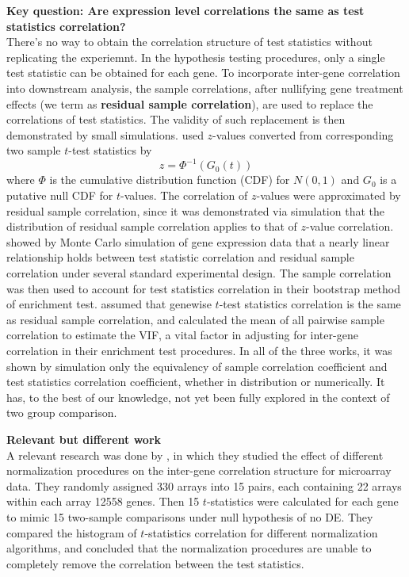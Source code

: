 \documentclass[11pt, a4paper]{article}
\begin{document}
\textbf{Key question: Are  expression level  correlations the same as test statistics correlation?}\\
There's no way to obtain the correlation structure of test statistics without replicating the experiemnt.  
In the hypothesis testing procedures, only a single test statistic can be obtained for each gene. To incorporate inter-gene correlation into downstream analysis,  the sample correlations, after nullifying gene treatment effects (we term as \textbf{residual sample correlation}), are used to replace the correlations of test statistics. The validity of such replacement is then demonstrated by small simulations. \cite{efron2007correlation} used $z$-values converted from corresponding two sample $t$-test statistics by 
\begin{equation}\label{t2z}
z  = \Phi^{-1}(G_0(t))
\end{equation}
where $\Phi$ is the cumulative distribution function (CDF) for $N(0, 1)$ and $G_0$ is a putative null CDF for $t$-values. The correlation of $z$-values were approximated by residual sample correlation, since it was demonstrated via simulation that the distribution of residual sample correlation applies to that of $z$-value correlation. \cite{barry2008statistical} showed by Monte Carlo simulation of gene expression data that a nearly linear relationship holds between test statistic correlation and residual sample correlation under several standard experimental design. The sample correlation was then used to account for test statistics correlation in their bootstrap method of enrichment test. \cite{wu2012camera} assumed that genewise $t$-test statistics correlation is the same as residual sample correlation, and calculated the mean of all pairwise sample correlation to estimate the VIF, a vital factor in adjusting for inter-gene correlation in their enrichment test procedures. In all of the three works, it was shown by simulation only the equivalency of sample correlation coefficient and test statistics correlation coefficient, whether in distribution or numerically. It has, to the best of our knowledge, not yet been fully explored in the context of two group comparison.

\textbf{Relevant but different work}\\
A relevant research was done by \cite{qiu2005effects}, in which they studied the effect of different normalization procedures on the inter-gene correlation structure for microarray data. They randomly assigned 330 arrays into 15 pairs, each containing 22 arrays within each array 12558 genes. Then 15 $t$-statistics were calculated for each gene to mimic 15 two-sample comparisons under null hypothesis of no DE. They compared the histogram of $t$-statistics correlation for different normalization algorithms, and concluded that the normalization procedures are unable to completely remove the correlation between the test statistics. %
\end{document}

